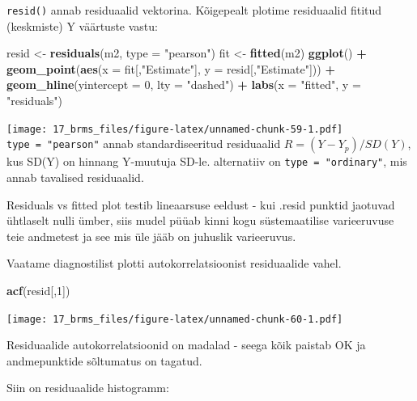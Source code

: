 \documentclass[]{book}
\newenvironment{Shaded}{\begin{snugshade}}{\end{snugshade}}
\newcommand{\DataTypeTok}[1]{\textcolor[rgb]{0.13,0.29,0.53}{#1}}
\newcommand{\DecValTok}[1]{\textcolor[rgb]{0.00,0.00,0.81}{#1}}
\newcommand{\KeywordTok}[1]{\textcolor[rgb]{0.13,0.29,0.53}{\textbf{#1}}}
\newcommand{\NormalTok}[1]{#1}
\newcommand{\OperatorTok}[1]{\textcolor[rgb]{0.81,0.36,0.00}{\textbf{#1}}}
\newcommand{\StringTok}[1]{\textcolor[rgb]{0.31,0.60,0.02}{#1}}
\begin{document}
\texttt{resid()} annab residuaalid vektorina.
Kõigepealt plotime residuaalid fititud (keskmiste) Y väärtuste vastu:

\begin{Shaded}
\begin{Highlighting}[]
\NormalTok{resid <-}\StringTok{ }\KeywordTok{residuals}\NormalTok{(m2, }\DataTypeTok{type =} \StringTok{"pearson"}\NormalTok{)}
\NormalTok{fit <-}\StringTok{ }\KeywordTok{fitted}\NormalTok{(m2)}
\KeywordTok{ggplot}\NormalTok{() }\OperatorTok{+}\StringTok{ }
\StringTok{  }\KeywordTok{geom_point}\NormalTok{(}\KeywordTok{aes}\NormalTok{(}\DataTypeTok{x =}\NormalTok{ fit[,}\StringTok{"Estimate"}\NormalTok{], }\DataTypeTok{y =}\NormalTok{ resid[,}\StringTok{"Estimate"}\NormalTok{])) }\OperatorTok{+}\StringTok{ }
\StringTok{  }\KeywordTok{geom_hline}\NormalTok{(}\DataTypeTok{yintercept =} \DecValTok{0}\NormalTok{, }\DataTypeTok{lty =} \StringTok{"dashed"}\NormalTok{) }\OperatorTok{+}
\StringTok{  }\KeywordTok{labs}\NormalTok{(}\DataTypeTok{x =} \StringTok{"fitted"}\NormalTok{, }\DataTypeTok{y =} \StringTok{"residuals"}\NormalTok{)}
\end{Highlighting}
\end{Shaded}

\texttt{[image: 17\_brms\_files/figure-latex/unnamed-chunk-59-1.pdf]}
\texttt{type\ =\ "pearson"} annab standardiseeritud residuaalid \(R = (Y - Y_p) / SD(Y)\), kus SD(Y) on hinnang Y-muutuja SD-le. alternatiiv on \texttt{type\ =\ "ordinary"}, mis annab tavalised residuaalid.

Residuals vs fitted plot testib lineaarsuse eeldust - kui .resid punktid jaotuvad ühtlaselt nulli ümber, siis mudel püüab kinni kogu süstemaatilise varieeruvuse teie andmetest ja see mis üle jääb on juhuslik varieeruvus.

Vaatame diagnostilist plotti autokorrelatsioonist residuaalide vahel.

\begin{Shaded}
\begin{Highlighting}[]
\KeywordTok{acf}\NormalTok{(resid[,}\DecValTok{1}\NormalTok{])}
\end{Highlighting}
\end{Shaded}

\texttt{[image: 17\_brms\_files/figure-latex/unnamed-chunk-60-1.pdf]}

Residuaalide autokorrelatsioonid on madalad - seega kõik paistab OK ja andmepunktide sõltumatus on tagatud.

Siin on residuaalide histogramm:
\end{document}
